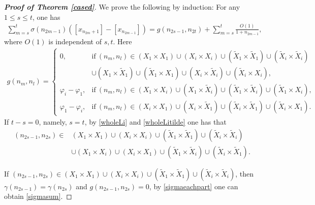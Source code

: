\documentclass[12pt]{amsart}
\theoremstyle{plain}
\theoremstyle{definition}
\begin{document}
\begin{proof}[\textbf{Proof of Theorem \ref{cased}}]
We prove the following by induction:
For any $1\leq s\leq t$, one has
\begin{align}
{\sum_{m=s}^t\sigma(n_{2m-1})(\left[x_{n_{2m}+1}\right]-\left[x_{n_{2m-1}}\right])}=g(n_{2s-1},n_{2t})+ \sum_{m=s}^{t}\frac{O(1)}{1+n_{2m-1}},\label{sigmasum}
\end{align}
where $O(1)$ is independent of $s,t$. Here
\begin{align}
g(n_{m},n_{l})=\begin{cases}
0, &\mathrm{if}\ (n_{m},n_{l})\in \left(X_1\times X_1\right)\cup \left(X_i\times X_i\right)\cup \left(\tilde{X}_1\times \tilde{X}_1\right)\cup \left(\tilde{X}_i\times \tilde{X}_i\right)\\
&\cup\left(X_1\times \tilde{X}_1\right)\cup \left(\tilde{X}_1\times X_1\right)\cup\left(X_i\times \tilde{X}_i\right)\cup\left(\tilde{X}_i\times X_i\right),\\
\varphi_i-\varphi_1, &\mathrm{if}\ (n_{m},n_{l})\in \left(X_1\times X_i\right)\cup \left({X}_1\times \tilde{X}_i\right)\cup \left(\tilde{X}_1\times \tilde{X}_i\right)\cup \left(\tilde{X}_1\times X_i\right),\\
\varphi_1-\varphi_i, &\mathrm{if}\ (n_{m},n_{l})\in \left(X_i\times X_1\right)\cup\left({X}_i\times \tilde{X}_1\right) \cup \left(\tilde{X}_i\times \tilde{X}_1\right)\cup \left(\tilde{X}_i\times X_1\right).
\end{cases}\nonumber
\end{align}
If $t-s=0$, namely, $s=t$, by \eqref{wholeLi} and \eqref{wholeLitilde} one has that 
\begin{align}
(n_{2s-1},n_{2s})\in &\left(X_1\times X_1\right)\cup \left(X_i\times X_i\right)\cup \left(\tilde{X}_1\times \tilde{X}_1\right)\cup \left(\tilde{X}_i\times \tilde{X}_i\right)\nonumber\\
&\cup\left(X_1\times X_i\right)\cup \left(X_i\times X_1\right)\cup \left(\tilde{X}_1\times \tilde{X}_i\right)\cup \left(\tilde{X}_i\times \tilde{X}_1\right).\nonumber
\end{align}

If $(n_{2s-1},n_{2s})\in \left(X_1\times X_1\right)\cup \left(X_i\times X_i\right)\cup \left(\tilde{X}_1\times \tilde{X}_1\right)\cup \left(\tilde{X}_i\times \tilde{X}_i\right)$, then $\gamma(n_{2s-1})=\gamma(n_{2s})$ and $g(n_{2s-1},n_{2s})=0$, by \eqref{sigmaeachpart} one can obtain \eqref{sigmasum}.


\end{proof}
\end{document}
